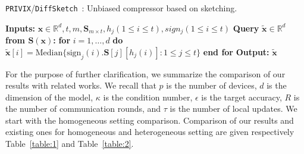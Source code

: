 \documentclass[sigconf, anonymous, review]{acmart}
\newtheorem{corollary}{Corollary}
\begin{document}
\begin{algorithm}[H]
\caption{\texttt{PRIVIX}/\texttt{DiffSketch}~\citep{li2019privacy}: Unbiased compressor based on sketching. }\label{Alg:privix}
\begin{algorithmic}[1]
\STATE \textbf{Inputs:} $\boldsymbol{x}\in\mathbb{R}^{d}, t, m, \mathbf{S}_{m\times t}, h_j (1\leq i\leq t), sign_j (1\leq i\leq t)$
\STATE \textbf{Query} $\tilde{\boldsymbol{x}}\in\mathbb{R}^d$ \textbf{from $\mathbf{S(\boldsymbol{x})}$:}
\STATE \textbf{for} $i=1,\ldots,d$ \textbf{do}
\STATE \quad\quad ${\tilde{\boldsymbol{x}}}[i]=\text{Median}\{\text{sign}_j(i).\mathbf{S}[j][h_j(i)]:1\leq j\leq t\}$ 
\STATE \textbf{end for}
\STATE \textbf{Output:} ${\tilde{\boldsymbol{x}}}$
\end{algorithmic}
\end{algorithm}



%

For the purpose of further clarification, we summarize the comparison of our results with related works. 
We recall that $p$ is the number of devices, $d$ is the dimension of the model, $\kappa$ is the condition number, $\epsilon$ is the target accuracy, $R$ is  the number of communication rounds, and $\tau$ is the number of local updates. 
We start with the homogeneous setting comparison.
Comparison of our results and existing ones for homogeneous and heterogeneous setting are given respectively Table~\ref{table:1} and Table~\ref{table:2}.
\end{document}
